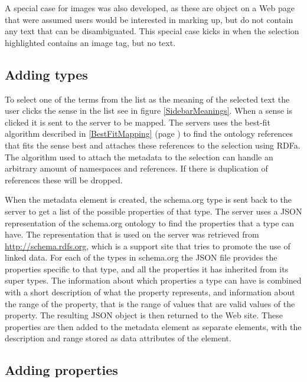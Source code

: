 A special case for images was also developed,
as these are object on a Web page that were assumed users would be interested in marking up,
but do not contain any text that can be disambiguated.
This special case kicks in when the selection highlighted contains an image tag, but no text.

\subsection{Adding types}

To select one of the terms from the list as the meaning of the selected text the user clicks the sense in the list see in
figure \ref{SidebarMeanings}.
When a sense is clicked it is sent to the server to be mapped.
The servers uses the best-fit algorithm described in \ref{BestFitMapping} (page \pageref{BestFitMapping}) to find the ontology references
that fits the sense best and attaches these references to the selection using RDFa.
The algorithm used to attach the metadata to the selection can handle an arbitrary amount of namespaces and references.
If there is duplication of references these will be dropped.

When the metadata element is created,
the schema.org type is sent back to the server to get a list of the possible properties of that type.
The server uses a JSON representation of the schema.org ontology to find the properties that a type can have.
The representation that is used on the server was retrieved from \url{http://schema.rdfs.org},
which is a support site that tries to promote the use of linked data.
For each of the types in schema.org the JSON file provides the properties specific to that type,
and all the properties it has inherited from its super types.
The information about which properties a type can have is combined with a short description of what the property represents,
and information about the range of the property, that is the range of values that are valid values of the property.
The resulting JSON object is then returned to the Web site.
These properties are then added to the metadata element as separate elements,
with the description and range stored as data attributes of the element.

\subsection{Adding properties}

